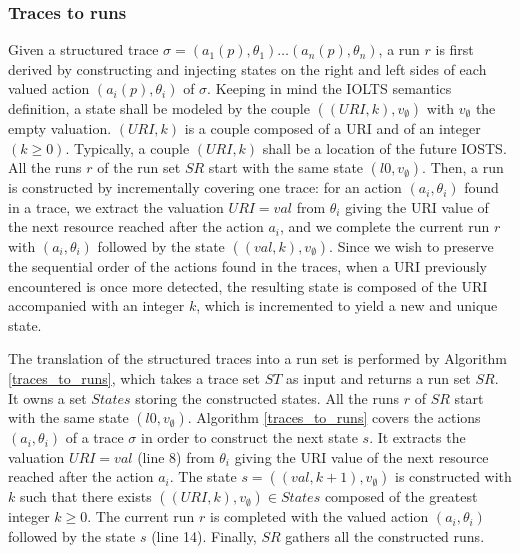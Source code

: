 \subsubsection{Traces to runs}

Given a structured trace $\sigma = (a_1(p),\theta_1) \dots
(a_n(p),\theta_n)$, a run $r$ is first derived by constructing
and injecting states on the right and left sides of
each valued action $(a_i(p),\theta_i)$ of $\sigma$. Keeping in
mind the IOLTS semantics definition, a state shall be modeled by
the couple $((URI,k),v_\emptyset)$ with $v_\emptyset$ the empty
valuation.  $(URI,k)$ is a couple composed of a URI and of an
integer $(k \geq 0)$. Typically, a couple $(URI,k)$ shall be a
location of the future IOSTS. All the runs $r$ of the run set
$SR$ start with the same state $(l0,v_\emptyset)$. Then, a run is
constructed by incrementally covering one trace: for an action
$(a_i,\theta_i)$ found in a trace, we extract the valuation
$URI=val$ from $\theta_i$ giving the URI value of the next
resource reached after the action $a_i$, and we complete the
current run $r$ with $(a_i,\theta_i)$ followed by the state
$((val,k),v_\emptyset)$.  Since we wish to preserve the
sequential order of the actions found in the traces, when a URI
previously encountered is once more detected, the resulting state
is composed of the URI accompanied with an integer $k$, which is
incremented to yield a new and unique state.

The translation of the structured traces into a run set is
performed by Algorithm \ref{traces_to_runs}, which takes a
trace set $ST$ as input and returns a run set $SR$. It owns a
set $States$ storing the constructed states. All the runs $r$ of
$SR$ start with the same state $(l0,v_\emptyset)$. Algorithm
\ref{traces_to_runs} covers the actions $(a_i,\theta_i)$ of a
trace $\sigma$ in order to construct the next state $s$. It
extracts the valuation $URI=val$ (line 8) from $\theta_i$ giving
the URI value of the next resource reached after the action
$a_i$. The state $s=((val,k+1),v_\emptyset)$ is constructed with
$k$ such that there exists $((URI,k),v_\emptyset) \in States$
composed of the greatest integer $k \geq 0$. The current run $r$
is completed with the valued action $(a_i,\theta_i)$ followed by
the state $s$ (line 14). Finally, $SR$ gathers all the
constructed runs.

